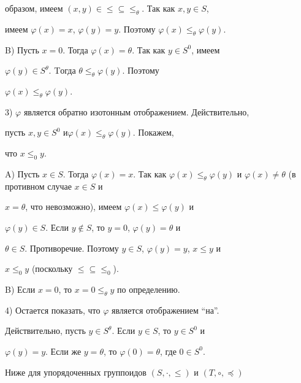 образом, имеем $(x,y)\in\le\subseteq\le_\theta$. Так как $x,y\in S$, 


имеем $\varphi(x)=x$, $\varphi(y)=y$. Поэтому $\varphi(x)\le_\theta 


\varphi(y)$. 


 


B) Пусть $x=0$. Тогда $\varphi(x)=\theta$. Так как $y\in S^0$, имеем 


$\varphi(y)\in S^\theta$. Tогда $\theta\le_\theta \varphi(y)$. Поэтому 


$\varphi(x)\le_\theta \varphi(y)$. 


 


3) $\varphi$ является обратно изотонным отображением. Действительно, 


пусть $x,y\in S^0$ и\linebreak $\varphi(x)\le_\theta \varphi(y)$. Покажем, 


что $x\le_0 y$. 


 


A) Пусть $x\in S$. Тогда $\varphi(x)=x$. Так как $\varphi(x)\le_\theta 


\varphi(y)$ и $\varphi(x)\ne\theta$ (в противном случае $x\in S$ и 


$x=\theta$, что невозможно), имеем $\varphi(x)\le\varphi(y)$ и 


$\varphi(y)\in S$. Если $y\notin S$, то $y=0$, $\varphi(y)=\theta$ и 


$\theta\in S$. Противоречие. Поэтому $y\in S$, $\varphi(y)=y$, $x\le y$ и 


$x\le_0 y$ (поскольку $\le\subseteq\le_0$). 


 


B) Если $x=0$, то $x=0\le_\theta y$ по определению. 


 


4) Остается показать, что $\varphi$ является отображением ``на''. 


Действительно, пусть $y\in S^\theta$. Если $y\in S$, то $y\in S^0$ и 


$\varphi(y)=y$. Если же $y=\theta$, то $\varphi(0)=\theta$, где $0\in 


S^0$. 


 


Ниже для упорядоченных группоидов $(S,\cdot,\le)$ и $(T,\circ,\preceq)$ 


